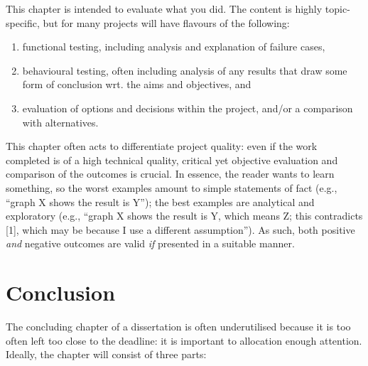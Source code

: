 \documentclass[ %
                    author={Lucas O'Dowd-Jones},
                supervisor={Dr. Alex Kavvos},
                    degree={MEng},
                     title={Variations on Normalisation by Evaluation in Haskell},
                  subtitle={},
                      type={programming languages},
                      year={2021}]{dissertation}
\begin{document}

\noindent
This chapter is intended to evaluate what you did.  The content is highly 
topic-specific, but for many projects will have flavours of the following:

\begin{enumerate}
\item functional  testing, including analysis and explanation of failure 
      cases,
\item behavioural testing, often including analysis of any results that 
      draw some form of conclusion wrt. the aims and objectives,
      and
\item evaluation of options and decisions within the project, and/or a
      comparison with alternatives.
\end{enumerate}

\noindent
This chapter often acts to differentiate project quality: even if the work
completed is of a high technical quality, critical yet objective evaluation 
and comparison of the outcomes is crucial.  In essence, the reader wants to
learn something, so the worst examples amount to simple statements of fact 
(e.g., ``graph X shows the result is Y''); the best examples are analytical 
and exploratory (e.g., ``graph X shows the result is Y, which means Z; this 
contradicts [1], which may be because I use a different assumption'').  As 
such, both positive {\em and} negative outcomes are valid {\em if} presented 
in a suitable manner.


\chapter{Conclusion}
\label{chap:conclusion}


\noindent
The concluding chapter of a dissertation is often underutilised because it 
is too often left too close to the deadline: it is important to allocation
enough attention.  Ideally, the chapter will consist of three parts:
\end{document}
